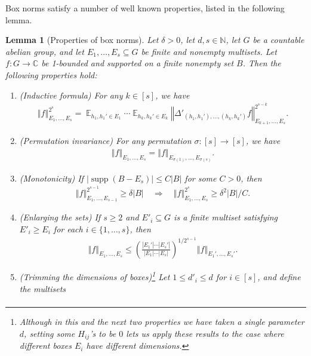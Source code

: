 \documentclass[11pt]{amsart}
\newtheorem{lemma}{Lemma}[section]
\theoremstyle{definition}
\DeclareMathOperator*{\E}{\mathbb{E}}
\newcommand{\C}{{\mathbb C}}
\newcommand{\N}{{\mathbb N}}
\DeclareMathOperator{\supp}{supp}
\newcommand{\norm}[1]{\left\Vert #1\right\Vert}
\newcommand{\brac}[1]{\mathopen{}\left( #1 \mathclose{}\right)}
\begin{document}
Box norms satisfy a number of well known properties, listed in the following lemma.
\begin{lemma}[Properties of box norms]\label{L: properties of box norms}
Let $\delta>0$, let $d,s\in\N$, let $G$ be a countable abelian group, 
and let $E_1, \ldots, E_s\subseteq G$ be finite {and nonempty} multisets. Let $f:G\to\C$ be 1-bounded and supported on a finite nonempty set $B$. Then the following properties hold:
\begin{enumerate}
    \item\label{i: inductive formula} (Inductive formula) For any $k\in[s]$, we have
    \begin{align*}
        \norm{f}_{E_1, \ldots, E_s}^{2^s} = \E_{h_1, h_1'\in E_1}\cdots \E_{h_k, h_k'\in E_k}\norm{\Delta'_{(h_1, h_1'), \ldots, (h_k, h_k')}f}_{E_{k+1}, \ldots, E_s}^{2^{s-k}}.
    \end{align*}
    \item\label{i: permutation invariance} (Permutation invariance) For any permutation $\sigma:[s]\to[s]$, we have 
    \begin{align*}
        \norm{f}_{E_1, \ldots, E_s} = \norm{f}_{E_{\sigma(1)}, \ldots, E_{\sigma(s)}}.
    \end{align*}
    \item\label{i: monotonicity} (Monotonicity) If %
    $|\supp(B-E_s)|\leq C|B|$ for some $C>0$, then
    \begin{align}\label{E: monotonicity}
        \norm{f}_{E_1, \ldots, E_{s-1}}^{2^{s-1}}\geq \delta|B| \quad \Longrightarrow \quad \norm{f}_{E_1, \ldots, E_{s}}^{2^{s}}\geq \delta^2|B|/C.
    \end{align}
    \item\label{i: enlarging} (Enlarging the sets) If $s\geq 2$ and $E'_i\subseteq G$ is a finite multiset satisfying $E'_i \geq E_i$ for each $i\in\{1,\ldots, s\}$, then
    \begin{align*}
        \norm{f}_{E_1, \ldots, E_s}\leq \brac{\frac{|E_1'|\cdots|E_s'|}{|E_1|\cdots|E_s|}}^{1/2^{s-1}}\norm{f}_{E_1', \ldots, E_s'}.
    \end{align*}
    \item\label{i: trimming} (Trimming the dimensions of boxes)\footnote{Although in this and the next two properties we have taken a single parameter $d$, setting some $H_{ij}$'s to be $0$ lets us apply these results to the case where different boxes $E_i$ have different dimensions.} Let $1\leq d'_i\leq d$ for $i\in[s]$, and define the multisets
    \begin{align*}

\end{align*}
\end{enumerate}
\end{lemma}
\end{document}
